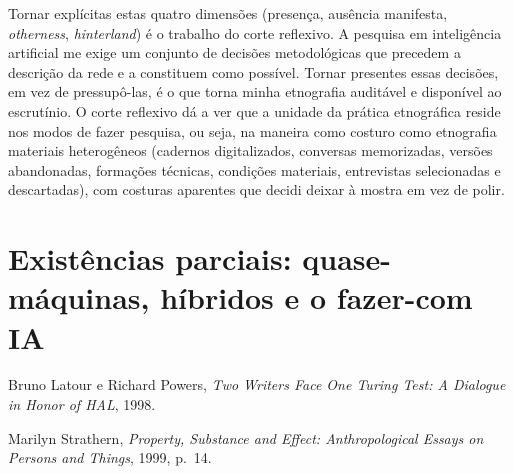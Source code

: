 Tornar explícitas estas quatro dimensões (presença, ausência manifesta, \textit{otherness}, \textit{hinterland}) é o trabalho do corte reflexivo. A pesquisa em inteligência artificial me exige um conjunto de decisões metodológicas que precedem a descrição da rede e a constituem como possível. Tornar presentes essas decisões, em vez de pressupô-las, é o que torna minha etnografia auditável e disponível ao escrutínio. O corte reflexivo dá a ver que a unidade da prática etnográfica reside nos modos de fazer pesquisa, ou seja, na maneira como costuro como etnografia materiais heterogêneos (cadernos digitalizados, conversas memorizadas, versões abandonadas, formações técnicas, condições materiais, entrevistas selecionadas e descartadas), com costuras aparentes que decidi deixar à mostra em vez de polir.

\section{Existências parciais: quase-máquinas, híbridos e o fazer-com IA}
\label{sec:existencias-parciais}

{Bruno Latour e Richard Powers, \textit{Two Writers Face One Turing Test: A Dialogue in Honor of HAL}, 1998.}

{Marilyn Strathern, \textit{Property, Substance and Effect: Anthropological Essays on Persons and Things}, 1999, p.~14.}

